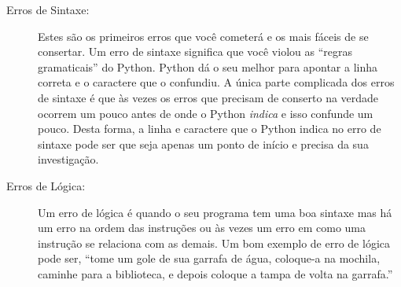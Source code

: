 \begin{description}
%

\item[Erros de Sintaxe:] Estes são os primeiros erros que você cometerá e os mais
fáceis de se consertar. Um erro de sintaxe significa que você violou as ``regras gramaticais''
do Python. Python dá o seu melhor para apontar a linha correta e o caractere que o
confundiu. A única parte complicada dos erros de sintaxe é que às vezes os erros
que precisam de conserto na verdade ocorrem um pouco antes de onde o Python {\em indica}
e isso confunde um pouco. Desta forma, a linha e  caractere que o Python indica
no erro de sintaxe pode ser que seja apenas um ponto de início e precisa da sua
investigação.
%

\item[Erros de Lógica:] Um erro de lógica é quando o seu programa tem uma boa sintaxe mas há
um erro na ordem das instruções ou às vezes um erro em como uma instrução se relaciona com
as demais. Um bom exemplo de erro de lógica pode ser, ``tome um gole de sua garrafa de água, coloque-a
na mochila, caminhe para a biblioteca, e depois coloque a tampa de volta na garrafa.''
%


\end{description}
